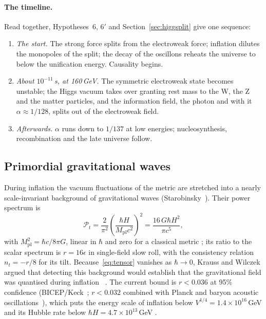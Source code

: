 \paragraph{The timeline.} Read together, Hypotheses~6, 6$'$ and Section~\ref{sec:higgsplit} give one sequence:
\begin{enumerate}[nosep]
\item \emph{The start.} The strong force splits from the electroweak force; inflation dilutes the monopoles of the split; the decay of the
oscillons reheats the universe to below the unification energy. Causality begins.
\item \emph{About $10^{-11}$\,s, at 160\,GeV.} The symmetric electroweak state becomes unstable; the Higgs vacuum takes over granting rest
mass to the W, the Z and the matter particles, and the information field, the photon and with it $\alpha\approx1/128$, splits out of the
electroweak field.
\item \emph{Afterwards.} $\alpha$ runs down to $1/137$ at low energies; nucleosynthesis, recombination and the late universe follow.
\end{enumerate}


\subsection{Primordial gravitational waves}\label{sec:tensor}

During inflation the vacuum fluctuations of the metric are stretched into a nearly scale-invariant background of gravitational waves
(Starobinsky~\cite{starobinsky79}). Their power spectrum is
\begin{equation}\label{eq:tensor}
\mathcal P_t=\frac{2}{\pi^2}\left(\frac{\hbar H}{M_{\text{pl}}c^2}\right)^2=\frac{16\,G\hbar H^2}{\pi c^5},
\end{equation}
with $M_{\text{pl}}^2=\hbar c/8\pi G$, linear in $\hbar$ and zero for a classical metric ; its ratio to the scalar spectrum is
$r=16\epsilon$ in single-field slow roll, with the consistency relation $n_t=-r/8$ for its tilt. Because~\eqref{eq:tensor} vanishes as
$\hbar\to0$, Krauss and Wilczek argued that detecting this background would establish that the gravitational field was quantised during
inflation~\cite{krausswilczek} \tagP. The current bound is $r<0.036$ at 95\% confidence (BICEP/Keck~\cite{bk18}; $r<0.032$ combined with
Planck and baryon acoustic oscillations~\cite{tristram}), which puts the energy scale of inflation below $V^{1/4}=1.4\times10^{16}$\,GeV
and its Hubble rate below $\hbar H=4.7\times10^{13}$\,GeV .

